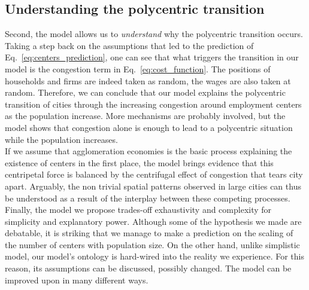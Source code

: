 \subsection{Understanding the polycentric transition}
\label{sub:understanding_the_polycentric_tranistion}

Second, the model allows us to \emph{understand} why the polycentric transition
occurs. Taking a step back on the assumptions that led to the prediction of
Eq.~\ref{eq:centers_prediction}, one can see that what triggers the transition
in our model is the congestion term in Eq.~\ref{eq:cost_function}. The positions
of households and firms are indeed taken as random, the wages are also taken at
random. Therefore, we can conclude that our model explains the polycentric
transition of cities through the increasing congestion around employment centers
as the population increase. More mechanisms are probably involved, but the model
shows that congestion alone is enough to lead to a polycentric situation while
the population increases.\\

If we assume that agglomeration economies is the basic process explaining the
existence of centers in the first place, the model brings evidence that this
centripetal force is balanced by the centrifugal effect of congestion that
tears city apart. Arguably, the non trivial spatial patterns observed in large cities can
thus be understood as a result of the interplay between these competing
processes.\\

Finally, the model we propose trades-off exhaustivity and complexity for simplicity and
explanatory power. Although some of the hypothesis we made are debatable, it is
striking that we manage to make a prediction on the scaling of the number of
centers with population size. On the other hand, unlike simplistic model, our
model's ontology is hard-wired into the reality we experience. For this reason,
its assumptions can be discussed, possibly changed. The model can be improved
upon in many different ways.
